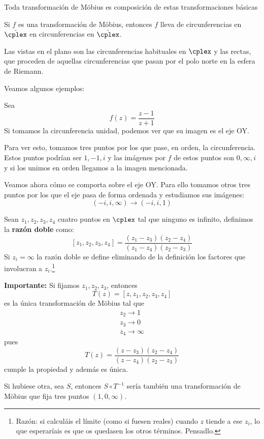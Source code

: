 \documentclass{apuntes}
\begin{document}
\obs Toda transformación de Möbius es composición de estas transformaciones básicas

\begin{theorem}
Si $f$ es una transformación de Möbius, entonces $f$ lleva de circunferencias en $\hat{\cplex}$ en circunferencias en $\hat{\cplex}$.
\end{theorem}
\obs Las  vistas en el plano son las circunferencias habituales en $\cplex$ y las rectas, que proceden de aquellas circunferencias que pasan por el polo norte en la esfera de Riemann.

Veamos algunos ejemplos:
\begin{example}
Sea
\[f(z)=\frac{z-1}{z+1}\]
Si tomamos la circunferencia unidad, podemos ver que su imagen es el eje OY.

Para ver esto, tomamos tres puntos por los que pase, en orden, la circunferencia. Estos puntos podrían ser $1,-1,i$ y las imágenes por $f$ de estos puntos son $0, \infty, i$ y si los unimos en orden llegamos a la imagen mencionada.

Veamos ahora cómo se comporta sobre el eje OY. Para ello tomamos otros tres puntos por los que el eje pasa de forma ordenada y estudiamos sus imágenes:
\[(-i,i,\infty) \to (-i,i,1)\]
\end{example}

\begin{defn}
Sean $z_1,z_2,z_3,z_4$ cuatro puntos en $\cplex$ tal que ninguno es infinito, definimos la \textbf{razón doble} como:
\[[z_1,z_2,z_3,z_4]=\frac{(z_1-z_3)(z_2-z_4)}{(z_1-z_4)(z_2-z_3)}\]
Si $z_i=\infty$ la razón doble se define eliminando de la definición los factores que involucran a $z_i$.\footnote{Razón: si calculáis el límite (como si fuesen reales) cuando $z$ tiende a ese $z_i$, lo que esperaríais es que os quedasen los otros términos. Pensadlo.}
\end{defn}

\textbf{Importante:} Si fijamos $z_1,z_2,z_3$, entonces
\[T(z)=[z,z_1,z_2,z_3,z_4]\]
es la única transformación de Möbius tal que
\begin{align*}
z_2 \to 1\\ z_3 \to 0 \\ z_4 \to \infty
\end{align*}
pues
\[T(z)=\frac{(z-z_3)(z_2-z_4)}{(z-z_4)(z_2-z_3)}\]
cumple la propiedad y además es única.

Si hubiese otra, sea $S$, entonces $S\circ T^{-1}$ sería también una transformación de Möbius que fija tres puntos $(1,0,\infty)$.
\end{document}
